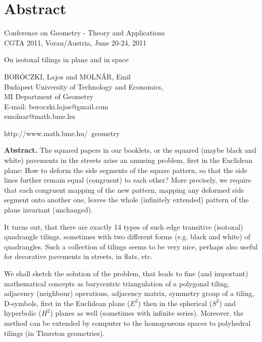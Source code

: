 \section{Abstract}
\begin{frame}
  \tiny
Conference on Geometry - Theory and Applications\\
CGTA 2011, Vorau/Austria, June 20-24, 2011
\vfill
\normalsize
\begin{center} On isotoxal tilings in plane and in space\end{center}

\vfill
\Tiny
BORÓCZKI, Lajos and MOLNÁR, Emil\\
Budapest University of Technology and Economics,\\
MI Department of Geometry\\
E-mail: boroczki.lajos@gmail.com\\
emolnar@math.bme.hu\\
\vfill

http://www.math.bme.hu/~geometry
\vfill

\tiny
\textbf{Abstract.} The squared papers in our booklets, or the squared (maybe black and white)
pavements in the streets arise an amusing problem, first in the Euclidean plane:
How to deform the side segments of the square pattern, so that the side lines
further remain equal (congruent) to each other? More precisely, we require that
each congruent mapping of the new pattern, mapping any deformed side segment
onto another one, leaves the whole (infinitely extended) pattern of the plane
invariant (unchanged).
\vfill

It turns out, that there are exactly 14 types of such  edge  transitive
(isotoxal) quadrangle tilings, sometimes  with  two  different  forms  (e.g.
black and white) of quadrangles. Such a collection of tilings seems  to  be
very nice, perhaps also useful  for  decorative  pavements  in  streets, in flats, etc.
\vfill

We shall sketch the solution of the problem, that leads to  fine  (and
important)  mathematical  concepts  as  barycentric   triangulation   of   a
polygonal  tiling,  adjacency  (neighbour)  operations,  adjacency   matrix,
symmetry group of a tiling, D-symbols, first in  the  Euclidean  plane  ($E^2$)
then in the spherical ($S^2$) and hyperbolic ($H^2$)  planes  as  well  (sometimes
with infinite series). Moreover, the method can be extended by  computer  to
the homogeneous spaces to polyhedral tilings (in Thurston geometries).
\vfill


\end{frame}
